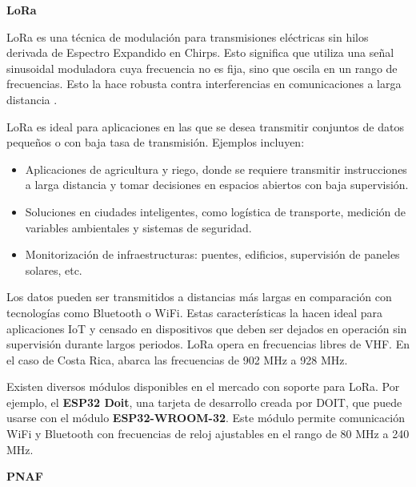 \documentclass[conference]{IEEEtran}
\begin{document}
\vspace{1em}
\begin{center}
\textbf{\large LoRa}
\end{center}

LoRa es una técnica de modulación para transmisiones eléctricas sin hilos derivada de Espectro Expandido en Chirps. Esto significa que utiliza una señal sinusoidal moduladora cuya frecuencia no es fija, sino que oscila en un rango de frecuencias. Esto la hace robusta contra interferencias en comunicaciones a larga distancia \cite{LoRa}.

\vspace{2mm}

LoRa es ideal para aplicaciones en las que se desea transmitir conjuntos de datos pequeños o con baja tasa de transmisión. Ejemplos incluyen:

\begin{itemize}
    \item Aplicaciones de agricultura y riego, donde se requiere transmitir instrucciones a larga distancia y tomar decisiones en espacios abiertos con baja supervisión.
    \item Soluciones en ciudades inteligentes, como logística de transporte, medición de variables ambientales y sistemas de seguridad.
    \item Monitorización de infraestructuras: puentes, edificios, supervisión de paneles solares, etc.
\end{itemize}

\newpage

Los datos pueden ser transmitidos a distancias más largas en comparación con tecnologías como Bluetooth o WiFi. Estas características la hacen ideal para aplicaciones IoT y censado en dispositivos que deben ser dejados en operación sin supervisión durante largos periodos. LoRa opera en frecuencias libres de VHF. En el caso de Costa Rica, abarca las frecuencias de 902 MHz a 928 MHz.

\vspace{2mm}

Existen diversos módulos disponibles en el mercado con soporte para LoRa. Por ejemplo, el \textbf{ESP32 Doit}, una tarjeta de desarrollo creada por DOIT, que puede usarse con el módulo \textbf{ESP32-WROOM-32}. Este módulo permite comunicación WiFi y Bluetooth con frecuencias de reloj ajustables en el rango de 80 MHz a 240 MHz.

\vspace{2mm}

\begin{center}
\textbf{\large PNAF}
\end{center}
\end{document}
